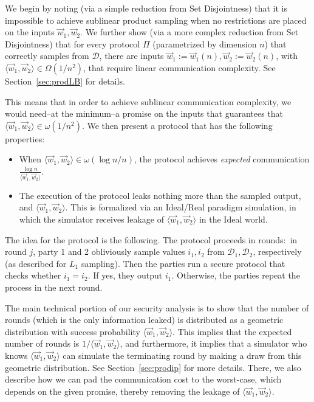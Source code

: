 We begin by noting (via a simple reduction from Set Disjointness)
that it is impossible to achieve sublinear product sampling when no restrictions are placed on the inputs $\vec{w}_1, \vec{w}_2$.
We further show (via a more complex reduction from Set Disjointness)
that for every protocol $\Pi$ 
(parametrized by dimension $n$) that correctly samples from $\mathcal{D}$,
there are inputs $\vec{w}_1 := \vec{w}_1(n), \vec{w}_2 := \vec{w}_2(n)$,
with $\langle \vec{w}_1, \vec{w}_2 \rangle \in \Omega(1/n^2)$,
that require linear communication complexity.
See Section~\ref{sec:prodLB} for details.

This means that in order to achieve sublinear communication complexity,
we would need--at the minimum--a promise on the inputs
that guarantees that $\langle \vec{w}_1, \vec{w}_2 \rangle \in \omega(1/n^2)$.  We then present a protocol that has the following properties:
\begin{itemize}
    \item When $\langle \vec{w}_1, \vec{w}_2 \rangle \in \omega(\log
    n/n)$, the protocol achieves \emph{expected} communication
    $\frac{\log n}{\langle \vec{w}_1, \vec{w}_2 \rangle}$. 

    
    \item The execution of the protocol leaks nothing more than the
    sampled output, and $\langle \vec{w}_1, \vec{w}_2 \rangle$.  This is
    formalized via an Ideal/Real paradigm simulation, in which the
    simulator receives leakage of $\langle \vec{w}_1, \vec{w}_2 \rangle$
    in the Ideal world.
\end{itemize}

The idea for the protocol is the following.  The protocol proceeds in
rounds:~in round $j$, party 1 and 2 obliviously sample values $i_1, i_2$
from $\mathcal{D}_1, \mathcal{D}_2$, respectively (as described for
$L_1$ sampling).  Then the parties run a secure protocol that checks
whether $i_1 = i_2$.  If yes, they output $i_1$. Otherwise, the parties
repeat the process in the next round.  

The main technical portion of our security analysis is to show that the
number of rounds (which is the only information leaked) is distributed
as a geometric distribution with success probability $\langle \vec{w}_1,
\vec{w}_2 \rangle$.  This implies that the expected number of rounds is
$1/\langle \vec{w}_1, \vec{w}_2 \rangle$, and furthermore, it implies
that a simulator who knows $\langle \vec{w}_1, \vec{w}_2 \rangle$ can
simulate the terminating round by making a draw from this geometric
distribution.  See Section~\ref{sec:prodip} for more details.  There, we
also describe how we can pad the communication cost to the worst-case,
which depends on the given promise, thereby removing the leakage of
$\langle \vec{w}_1, \vec{w}_2 \rangle$.  

